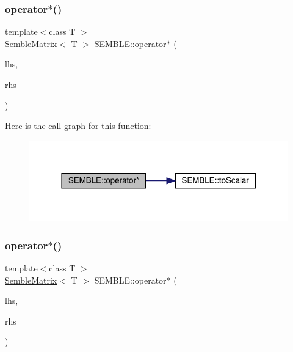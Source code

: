 \mbox{\label{namespaceSEMBLE_a72755a935cffff79de3ac06ac128b07a}} 
\subsubsection{\texorpdfstring{operator$\ast$()}{operator*()}\hspace{0.1cm}{\footnotesize\ttfamily [14/20]}}
{\footnotesize\ttfamily template$<$class T $>$ \\
\mbox{\hyperlink{structSEMBLE_1_1SembleMatrix}{Semble\+Matrix}}$<$ T $>$ S\+E\+M\+B\+L\+E\+::operator$\ast$ (\begin{DoxyParamCaption}\item[{const \mbox{\hyperlink{structSEMBLE_1_1SembleMatrix}{Semble\+Matrix}}$<$ T $>$ \&}]{lhs,  }\item[{const typename \mbox{\hyperlink{structSEMBLE_1_1PromoteScalar}{Promote\+Scalar}}$<$ T $>$\+::Type \&}]{rhs }\end{DoxyParamCaption})}

Here is the call graph for this function\+:
\nopagebreak
\begin{figure}[H]
\begin{center}
\leavevmode
\includegraphics[width=318pt]{d7/dfd/namespaceSEMBLE_a72755a935cffff79de3ac06ac128b07a_cgraph}
\end{center}
\end{figure}
\mbox{\label{namespaceSEMBLE_a183fae303991bec98acb922d225f9897}} 
\subsubsection{\texorpdfstring{operator$\ast$()}{operator*()}\hspace{0.1cm}{\footnotesize\ttfamily [15/20]}}
{\footnotesize\ttfamily template$<$class T $>$ \\
\mbox{\hyperlink{structSEMBLE_1_1SembleMatrix}{Semble\+Matrix}}$<$ T $>$ S\+E\+M\+B\+L\+E\+::operator$\ast$ (\begin{DoxyParamCaption}\item[{const typename \mbox{\hyperlink{structSEMBLE_1_1PromoteScalar}{Promote\+Scalar}}$<$ T $>$\+::Type \&}]{lhs,  }\item[{const \mbox{\hyperlink{structSEMBLE_1_1SembleMatrix}{Semble\+Matrix}}$<$ T $>$ \&}]{rhs }\end{DoxyParamCaption})}

